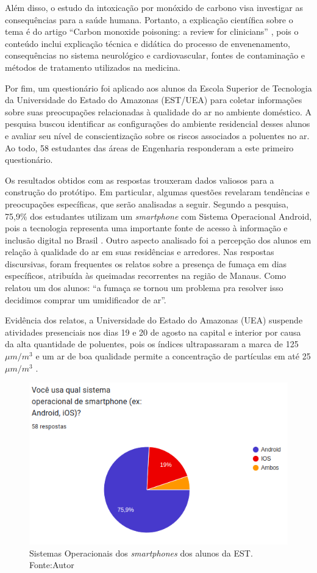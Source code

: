 Além disso, o estudo da intoxicação por monóxido de carbono visa investigar as consequências para a saúde humana. Portanto, a explicação científica sobre o tema é do 
artigo ``Carbon monoxide poisoning: a review for clinicians'' \cite{carbon-monoxide-poisoning-varon}, pois o conteúdo inclui 
explicação técnica e didática do processo de envenenamento, consequências no sistema neurológico e cardiovascular, fontes de contaminação e métodos de tratamento utilizados na medicina.

Por fim, um questionário foi aplicado aos alunos da Escola Superior de Tecnologia da Universidade do Estado do Amazonas (EST/UEA) para coletar informações sobre suas preocupações relacionadas à qualidade do ar no ambiente doméstico.
A pesquisa buscou identificar as configurações do ambiente residencial desses alunos e avaliar seu nível de conscientização sobre os riscos associados a poluentes no ar. Ao todo, 
58 estudantes das áreas de Engenharia responderam a este primeiro questionário.

Os resultados obtidos com as respostas trouxeram dados valiosos para a construção do protótipo. Em particular, algumas questões revelaram tendências e 
preocupações específicas, que serão analisadas a seguir. Segundo a pesquisa, 75,9\% dos estudantes utilizam um \textit{smartphone} com 
Sistema Operacional Android, pois a tecnologia representa uma importante fonte de acesso à informação e inclusão digital no Brasil \cite{impacto-android-brasil}. Outro aspecto analisado foi 
a percepção dos alunos em relação à qualidade do ar em suas residências e arredores. Nas respostas discursivas, foram frequentes os relatos sobre a presença de fumaça em dias específicos, 
atribuída às queimadas recorrentes na região de Manaus. Como relatou um dos alunos: ``a fumaça se tornou um problema pra resolver isso decidimos comprar um umidificador de ar''. 

Evidência dos relatos, a Universidade do Estado do Amazonas (UEA) suspende atividades presenciais nos dias 19 e 20 de agosto na capital e interior por causa 
da alta quantidade de poluentes, pois os índices ultrapassaram a marca de 125 $\mu m/m^{3}$ e um ar de boa qualidade permite a concentração de partículas em  até 25 $\mu m/m^{3}$ \cite{uea-queima-fecha}. 

\begin{figure}[ht]
    \centering
    \includegraphics[width=.67\textwidth]{img/graf1-SO-smartphone.png}
    \caption{Sistemas Operacionais dos \textit{smartphones} dos alunos da EST. Fonte:Autor}\label{figSOsmartphone}
\end{figure}

